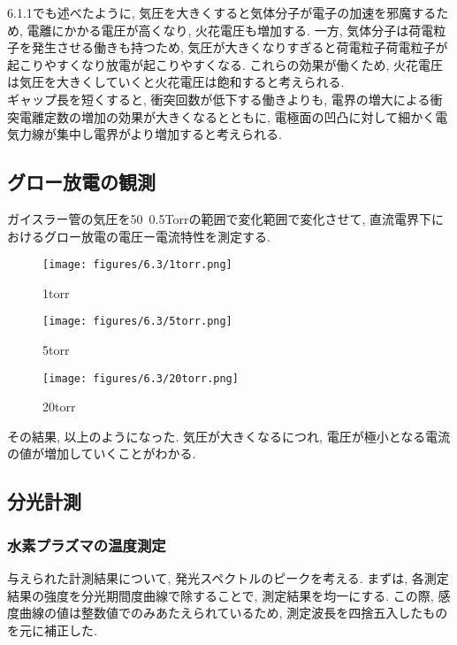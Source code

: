 \documentclass{ltjsarticle}
\begin{document}
6.1.1でも述べたように, 気圧を大きくすると気体分子が電子の加速を邪魔するため, 電離にかかる電圧が高くなり, 火花電圧も増加する. 一方, 気体分子は荷電粒子を発生させる働きも持つため, 気圧が大きくなりすぎると荷電粒子荷電粒子が起こりやすくなり放電が起こりやすくなる. これらの効果が働くため, 火花電圧は気圧を大きくしていくと火花電圧は飽和すると考えられる. \\

ギャップ長を短くすると, 衝突回数が低下する働きよりも, 電界の増大による衝突電離定数の増加の効果が大きくなるとともに, 電極面の凹凸に対して細かく電気力線が集中し電界がより増加すると考えられる. 

\newpage
\subsection{グロー放電の観測}
ガイスラー管の気圧を50~0.5Torrの範囲で変化範囲で変化させて, 直流電界下におけるグロー放電の電圧ー電流特性を測定する. 

\begin{figure}[H]
    \centering
    \begin{minipage}[b]{0.48\textwidth}
      \texttt{[image: figures/6.3/1torr.png]}
      \caption{1torr}
    \end{minipage}
    \hfill
    \begin{minipage}[b]{0.48\textwidth}
      \texttt{[image: figures/6.3/5torr.png]}
      \caption{5torr}
    \end{minipage}
\end{figure}

\begin{figure}[H]
    \begin{center}
        \texttt{[image: figures/6.3/20torr.png]}
        \caption{20torr}
    \end{center}
\end{figure}

その結果, 以上のようになった. 気圧が大きくなるにつれ, 電圧が極小となる電流の値が増加していくことがわかる. 

\subsection{分光計測}
\subsubsection{水素プラズマの温度測定}
与えられた計測結果について, 発光スペクトルのピークを考える. まずは, 各測定結果の強度を分光期間度曲線で除することで, 測定結果を均一にする. この際, 感度曲線の値は整数値でのみあたえられているため, 測定波長を四捨五入したものを元に補正した. \\
\end{document}
